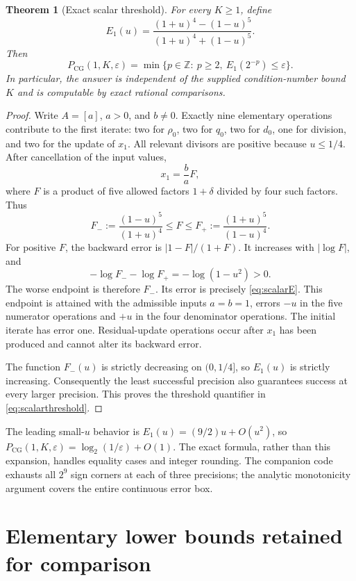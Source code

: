 \documentclass[11pt]{article}
\newtheorem{theorem}{Theorem}[section]
\theoremstyle{remark}\newtheorem{remark}[theorem]{Remark}
\newcommand{\PCG}{P_{\mathrm{CG}}}
\newcommand{\eps}{\varepsilon}
\begin{document}
\begin{theorem}[Exact scalar threshold]\label{thm:scalar}
For every $K\ge1$, define
\begin{equation}\label{eq:scalarE}
E_1(u)=\frac{(1+u)^4-(1-u)^5}{(1+u)^4+(1-u)^5}.
\end{equation}
Then
\begin{equation}\label{eq:scalarthreshold}
\PCG(1,K,\eps)=\min\{p\in\mathbb Z:\ p\ge2,
\ E_1(2^{-p})\le\eps\}.
\end{equation}
In particular, the answer is independent of the supplied condition-number
bound $K$ and is computable by exact rational comparisons.
\end{theorem}
\begin{proof}
Write $A=[a]$, $a>0$, and $b\ne0$. Exactly nine elementary operations
contribute to the first iterate: two for $\rho_0$, two for $q_0$, two
for $d_0$, one for division, and two for the update of $x_1$.
All relevant divisors are positive because $u\le1/4$.
After cancellation of the input values,
\[
x_1=\frac ba F,
\]
where $F$ is a product of five allowed factors $1+\delta$ divided by
four such factors. Thus
\[
F_-:=\frac{(1-u)^5}{(1+u)^4}\le F\le
F_+:=\frac{(1+u)^5}{(1-u)^4}.
\]
For positive $F$, the backward error is $|1-F|/(1+F)$.
It increases with $|\log F|$, and
\[
-\log F_- -\log F_+=-\log(1-u^2)>0.
\]
The worse endpoint is therefore $F_-$. Its error is precisely
\eqref{eq:scalarE}. This endpoint is attained with the admissible inputs
$a=b=1$, errors $-u$ in the five numerator operations and $+u$ in the
four denominator operations. The initial iterate has error one.
Residual-update operations occur after $x_1$ has been produced and cannot
alter its backward error.

The function $F_-(u)$ is strictly decreasing on $(0,1/4]$, so $E_1(u)$
is strictly increasing. Consequently the least successful precision also
guarantees success at every larger precision. This proves the threshold
quantifier in \eqref{eq:scalarthreshold}.
\end{proof}

The leading small-$u$ behavior is $E_1(u)=(9/2)u+O(u^2)$, so
$\PCG(1,K,\eps)=\log_2(1/\eps)+O(1)$. The exact formula, rather than
this expansion, handles equality cases and integer rounding. The
companion code exhausts all $2^9$ sign corners at each of three precisions;
the analytic monotonicity argument covers the entire continuous error box.

\section{Elementary lower bounds retained for comparison}
\label{sec:lower}
\end{document}
